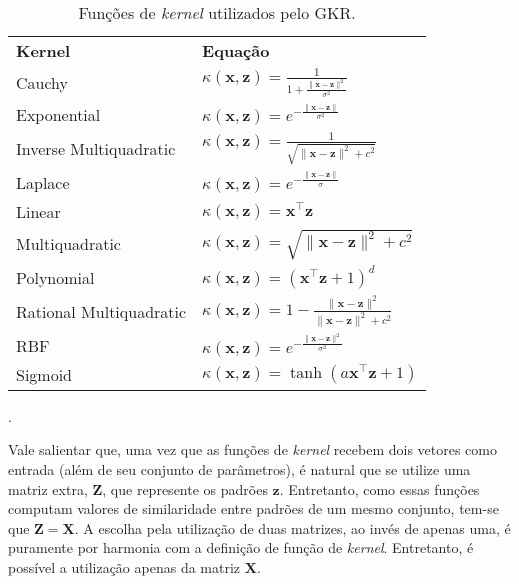 \begin{table}[H]
    \caption{Funções de \textit{kernel} utilizados pelo GKR.}
    \begin{center} \label{tab:gkr-kernels}
        {
        \def\arraystretch{1.8}\tabcolsep=10pt
        \begin{tabular}{l@{\hskip 18pt}l}
            \hline\noalign{\smallskip}
            \textbf{Kernel} & \textbf{Equação} \\
            \noalign{\smallskip}
            \hline
            \noalign{\smallskip}
            Cauchy 		            & $\kappa(\mathbf{x},\mathbf{z}) = \frac{1}{1 + \frac{\|\mathbf{x} - \mathbf{z}\|^2}{\sigma^2}}$ \\
            Exponential             & $\kappa(\mathbf{x},\mathbf{z}) = e^{-\frac{\|\mathbf{x} - \mathbf{z}\|}{\sigma^2}}$ \\
            Inverse Multiquadratic  & $\kappa(\mathbf{x},\mathbf{z}) = \frac{1}{\sqrt{\|\mathbf{x} - \mathbf{z}\|^2 + c^2}}$ \\
            Laplace		            & $\kappa(\mathbf{x},\mathbf{z}) = e^{-\frac{\|\mathbf{x} - \mathbf{z}\|}{\sigma}}$ \\
            Linear		            & $\kappa(\mathbf{x},\mathbf{z}) = \mathbf{x}^{\top}\mathbf{z}$ \\
            Multiquadratic          & $\kappa(\mathbf{x},\mathbf{z}) = \sqrt{\|\mathbf{x} - \mathbf{z}\|^2 + c^2}$ \\
            Polynomial	            & $\kappa(\mathbf{x},\mathbf{z}) = (\mathbf{x}^{\top}\mathbf{z} + 1)^d$ \\
            Rational Multiquadratic & $\kappa(\mathbf{x},\mathbf{z}) = 1 - \frac{\|\mathbf{x} - \mathbf{z}\|^2}{\|\mathbf{x} - \mathbf{z}\|^2 + c^2}$ \\
            RBF	                    & $\kappa(\mathbf{x},\mathbf{z}) = e^{-\frac{\|\mathbf{x} - \mathbf{z}\|^2}{\sigma^2}}$ \\
            Sigmoid         		& $\kappa(\mathbf{x},\mathbf{z}) = \tanh(a\mathbf{x}^{\top}\mathbf{z} + 1)$ \\
            \hline
        \end{tabular}
    }
    \end{center}
    \begin{center}
        .
    \end{center}
\end{table}

Vale salientar que, uma vez que as funções de \textit{kernel} recebem dois vetores como entrada (além de seu conjunto de parâmetros), é natural que se utilize uma matriz extra, $\mathbf{Z}$, que represente os padrões $\mathbf{z}$. Entretanto, como essas funções computam valores de similaridade entre padrões de um mesmo conjunto, tem-se que $\mathbf{Z} = \mathbf{X}$. A escolha pela utilização de duas matrizes, ao invés de apenas uma, é puramente por harmonia com a definição de função de \textit{kernel}. Entretanto, é possível a utilização apenas da matriz $\mathbf{X}$.

